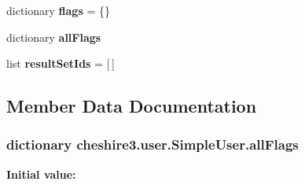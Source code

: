 \begin{DoxyCompactItemize}
\item 
\hypertarget{classcheshire3_1_1user_1_1_simple_user_afdf2ccc593f1489cffc478ac1397967e}{dictionary {\bfseries flags} = \{\}}\label{classcheshire3_1_1user_1_1_simple_user_afdf2ccc593f1489cffc478ac1397967e}

\item 
dictionary {\bfseries all\-Flags}
\item 
\hypertarget{classcheshire3_1_1user_1_1_simple_user_a143ec814eec1aea8ce24f7e45e88f9ab}{list {\bfseries result\-Set\-Ids} = \mbox{[}$\,$\mbox{]}}\label{classcheshire3_1_1user_1_1_simple_user_a143ec814eec1aea8ce24f7e45e88f9ab}

\end{DoxyCompactItemize}


\subsection{Member Data Documentation}
\hypertarget{classcheshire3_1_1user_1_1_simple_user_ae6fef8e6396b75fa4999fe1c22e46389}{
\subsubsection[{all\-Flags}]{\setlength{\rightskip}{0pt plus 5cm}dictionary cheshire3.\-user.\-Simple\-User.\-all\-Flags\hspace{0.3cm}{\ttfamily [static]}}}\label{classcheshire3_1_1user_1_1_simple_user_ae6fef8e6396b75fa4999fe1c22e46389}
{\bfseries Initial value\-:}
